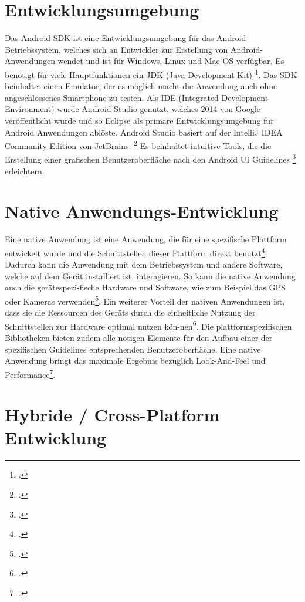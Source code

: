 \section{Entwicklungsumgebung}

Das Android SDK ist eine Entwicklungsumgebung für das Android Betriebssystem, welches sich an Entwickler zur Erstellung von Android-Anwendungen wendet und ist für Windows, Linux und Mac OS verfügbar. Es benötigt für viele Hauptfunktionen ein JDK (Java Development Kit) \footcite{AndroidSDK}. Das SDK beinhaltet einen Emulator, der es möglich macht die Anwendung auch ohne angeschlossenes Smartphone zu testen. Als IDE (Integrated Development Environment) wurde Android Studio genutzt, welches 2014 von Google veröffentlicht wurde und so Eclipse als primäre Entwicklungsumgebung für Android Anwendungen ablöste. Android Studio basiert auf der IntelliJ IDEA Community Edition von JetBrains. \footcite{AndroidOP} Es beinhaltet intuitive Tools, die die Erstellung einer grafischen Benutzeroberfläche nach den Android UI Guidelines \footcite{AndroidGuidelines} erleichtern. 

\section{Native Anwendungs-Entwicklung}

Eine native Anwendung ist eine Anwendung, die für eine spezifische Plattform entwickelt wurde und die Schnittstellen dieser Plattform direkt benutzt\footcite{Varianten}. Dadurch kann die Anwendung mit dem Betriebssystem und andere Software, welche auf dem Gerät installiert ist, interagieren. So kann die native Anwendung auch die gerätespezi-fische Hardware und Software, wie zum Beispiel das GPS oder Kameras verwenden\footcite{nativeApp1}. Ein weiterer Vorteil der nativen Anwendungen ist, dass sie die Ressourcen des Geräts durch die einheitliche Nutzung der Schnittstellen zur Hardware optimal nutzen kön-nen\footcite{nativeApp1}. Die plattformspezifischen Bibliotheken bieten zudem alle nötigen Elemente für den Aufbau einer der spezifischen Guidelines entsprechenden Benutzeroberfläche. Eine native Anwendung bringt das maximale  Ergebnis bezüglich Look-And-Feel und Performance\footcite{Varianten}.

\section{Hybride / Cross-Platform Entwicklung}


